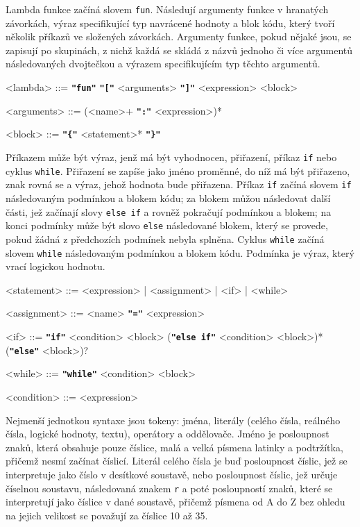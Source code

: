 \documentclass[a4paper,12pt]{article}
\def\emphasis #1{\textbf{\texttt{"#1"}}}
\begin{document}
Lambda funkce začíná slovem \texttt{fun}. Následují argumenty funkce v hranatých závorkách, výraz specifikující typ navrácené hodnoty a blok kódu, který tvoří několik příkazů ve složených závorkách. Argumenty funkce, pokud nějaké jsou, se zapisují po skupinách, z nichž každá se skládá z názvů jednoho či více argumentů následovaných dvojtečkou a výrazem specifikujícím typ těchto argumentů.
\begin{grammar}
<lambda> ::= \emphasis{fun} \emphasis{[} <arguments> \emphasis{]} <expression> <block>

<arguments> ::= (<name>+ \emphasis{:} <expression>)*

<block> ::= \emphasis{\{} <statement>* \emphasis{\}}
\end{grammar}

Příkazem může být výraz, jenž má být vyhodnocen, přiřazení, příkaz \texttt{if} nebo cyklus \texttt{while}. Přiřazení se zapíše jako jméno proměnné, do níž má být přiřazeno, znak rovná se a výraz, jehož hodnota bude přiřazena. Příkaz \texttt{if} začíná slovem \texttt{if} následovaným podmínkou a blokem kódu; za blokem můžou následovat další části, jež začínají slovy \texttt{else if} a rovněž pokračují podmínkou a blokem; na konci podmínky může být slovo \texttt{else} následované blokem, který se provede, pokud žádná z předchozích podmínek nebyla splněna. Cyklus \texttt{while} začíná slovem \texttt{while} následovaným podmínkou a blokem kódu. Podmínka je výraz, který vrací logickou hodnotu.
\begin{grammar}
<statement> ::= <expression> | <assignment> | <if> | <while>

<assignment> ::= <name> \emphasis{=} <expression>

<if> ::= \emphasis{if} <condition> <block> (\emphasis{else if} <condition> <block>)* (\emphasis{else} <block>)?

<while> ::= \emphasis{while} <condition> <block>

<condition> ::= <expression>
\end{grammar}

Nejmenší jednotkou syntaxe jsou tokeny: jména, literály (celého čísla, reálného čísla, logické hodnoty, textu), operátory a oddělovače. Jméno je posloupnost znaků, která obsahuje pouze číslice, malá a velká písmena latinky a podtržítka, přičemž nesmí začínat číslicí. Literál celého čísla je buď posloupnost číslic, jež se interpretuje jako číslo v desítkové soustavě, nebo posloupnost číslic, jež určuje číselnou soustavu, následovaná znakem \texttt{r} a poté posloupností znaků, které se interpretují jako číslice v dané soustavě, přičemž písmena od A do Z bez ohledu na jejich velikost se považují za číslice 10 až 35.
\end{document}
